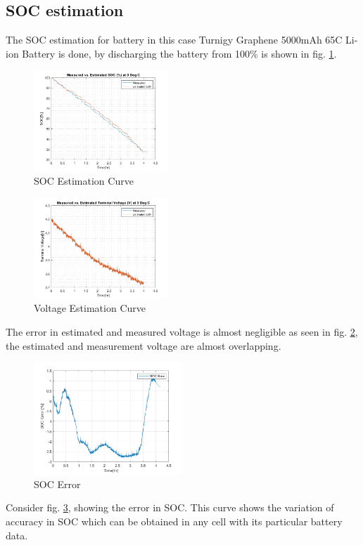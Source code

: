 \documentclass[conference]{IEEEtran}
\begin{document}
\subsection{SOC estimation}
\hspace{0.5cm}The SOC estimation for battery in this case Turnigy Graphene 5000mAh 65C Li-ion Battery is done, by discharging the battery from 100\% is shown in fig. \ref{soc_estimation_curve}.
\begin{figure}[htbp]
    \centering
    \includegraphics[width=0.45\textwidth]{images/soc_estimation_curve.png}
    \caption{SOC Estimation Curve}
    \label{soc_estimation_curve}
\end{figure}
\begin{figure}[htbp]
    \centering
    \includegraphics[width=0.45\textwidth]{images/voltage_estimation_curve.png}
    \caption{Voltage Estimation Curve}
    \label{voltage_estimation_curve}
\end{figure}
\newline The error in estimated and measured voltage is almost negligible as seen in fig. \ref{voltage_estimation_curve}, the estimated and measurement voltage are almost overlapping.
\begin{figure}[htbp]
    \centering
    \includegraphics[width=0.5\textwidth]{images/soc_error.png}
    \caption{SOC Error}
    \label{soc_error}
\end{figure}
\newline
Consider fig. \ref{soc_error}, showing the error in SOC. This curve shows the variation of accuracy in SOC which can be obtained in any cell with its particular battery data.
\end{document}
